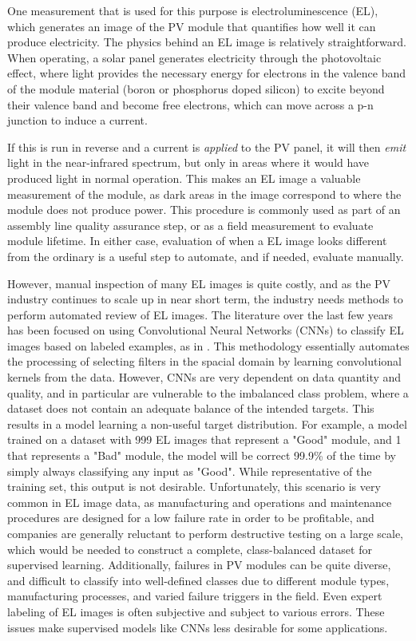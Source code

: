 \documentclass[12pt]{article}
\begin{document}
One measurement that is used for this purpose is electroluminescence (EL), which generates an image of the PV module that quantifies how well it can produce electricity. 
The physics behind an EL image is relatively straightforward. 
When operating, a solar panel generates electricity through the photovoltaic effect, where light provides the necessary energy for electrons in the valence band of the module material (boron or phosphorus doped silicon) to excite beyond their valence band and become free electrons, which can move across a p-n junction to induce a current. 

If this is run in reverse and a current is \textit{applied} to the PV panel, it will then \textit{emit} light in the near-infrared spectrum, but only in areas where it would have produced light in normal operation. 
This makes an EL image a valuable measurement of the module, as dark areas in the image correspond to where the module does not produce power.  
This procedure is commonly used as part of an assembly line quality assurance step, or as a field measurement to evaluate module lifetime. 
In either case, evaluation of when a EL image looks different from the ordinary is a useful step to automate, and if needed, evaluate manually. 


However, manual inspection of many EL images is quite costly, and as the PV industry continues to scale up in near short term, the industry needs methods to perform automated review of EL images. 
The literature over the last few years has been focused on using Convolutional Neural Networks (CNNs) to classify EL images based on labeled examples, as in \cite{akram_cnn_2019}. 
This methodology essentially automates the processing of selecting filters in the spacial domain by learning convolutional kernels from the data. 
However, CNNs are very dependent on data quantity and quality, and in particular are vulnerable to the imbalanced class problem, where a dataset does not contain an adequate balance of the intended targets. 
This results in a model learning a non-useful target distribution.
For example, a model trained on a dataset with 999 EL images that represent a "Good" module, and 1 that represents a "Bad" module, the model will be correct 99.9\% of the time by simply always classifying any input as "Good".
While representative of the training set, this output is not desirable. 
Unfortunately, this scenario is very common in EL image data, as manufacturing and operations and maintenance procedures are designed for a low failure rate in order to be profitable, and companies are generally reluctant to perform destructive testing on a large scale, which would be needed to construct a complete, class-balanced dataset for supervised learning. 
Additionally, failures in PV modules can be quite diverse, and difficult to classify into well-defined classes due to different module types, manufacturing processes, and varied failure triggers in the field. 
Even expert labeling of EL images is often subjective and subject to various errors. 
These issues make supervised models like CNNs less desirable for some applications. 
\end{document}
